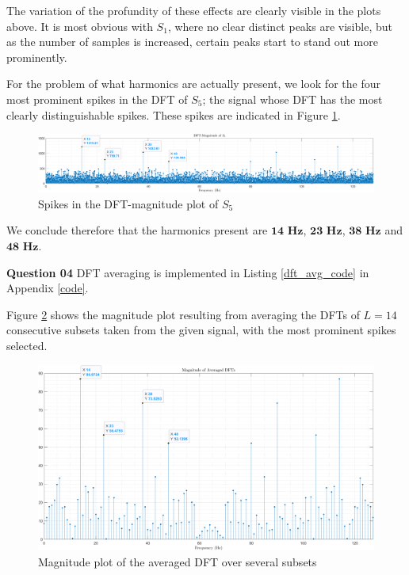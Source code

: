 \documentclass{article}[a4paper]
\begin{document}
	The variation of the profundity of these effects are clearly visible in the plots above. It is most obvious with $S_1$, where no clear distinct peaks are visible, but as the number of samples is increased, certain peaks start to stand out more prominently.
	
	For the problem of what harmonics are actually present, we look for the four most prominent spikes in the DFT of $S_5$; the signal whose DFT has the most clearly distinguishable spikes. These spikes are indicated in Figure \ref{dft_spikes}.
	
	\begin{figure}[H]
		\centering
		\includegraphics[width=\linewidth]{images/q1_3_1_peaks.png}
		\caption{Spikes in the DFT-magnitude plot of $S_5$}
		\label{dft_spikes}
	\end{figure}
	
	We conclude therefore that the harmonics present are $\mathbf{14}\textbf{ Hz}$, $\mathbf{23}\textbf{ Hz}$, $\mathbf{38}\textbf{ Hz}$ and $\mathbf{48}\textbf{ Hz}$.
	\medskip
	
	\textbf{Question 04} DFT averaging is implemented in Listing \ref{dft_avg_code} in Appendix \ref{code}.
	
	Figure \ref{avg_dft} shows the magnitude plot resulting from averaging the DFTs of $L = 14$ consecutive subsets taken from the given signal, with the most prominent spikes selected.
	
	\begin{figure}[H]
		\centering
		\includegraphics[width=\linewidth]{images/q1_3_2.png}
		\caption{Magnitude plot of the averaged DFT over several subsets}
		\label{avg_dft}
	\end{figure}
	
\end{document}
